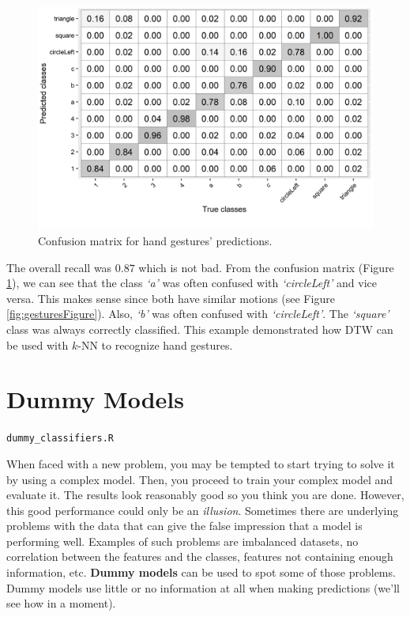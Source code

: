 \documentclass[
  11pt,
]{krantz}
\makeatletter
\newenvironment{kframe}{%
\medskip{}
\setlength{\fboxsep}{.8em}
 \def\at@end@of@kframe{}%
 \ifinner\ifhmode%
  \def\at@end@of@kframe{\end{minipage}}%
  \begin{minipage}{\columnwidth}%
 \fi\fi%
 \def\FrameCommand##1{\hskip\@totalleftmargin \hskip-\fboxsep
 \colorbox{shadecolor}{##1}\hskip-\fboxsep
     \hskip-\linewidth \hskip-\@totalleftmargin \hskip\columnwidth}%
 \MakeFramed {\advance\hsize-\width
   \@totalleftmargin\z@ \linewidth\hsize
   \@setminipage}}%
 {\par\unskip\endMakeFramed%
 \at@end@of@kframe}
\newenvironment{rmdblock}[1]
  {
  \begin{itemize}
  \renewcommand{\labelitemi}{
    \raisebox{-.7\height}[0pt][0pt]{
      {\setkeys{Gin}{width=3em,keepaspectratio}\texttt{[image: images/icons/\#1]}}
    }
  }
  \setlength{\fboxsep}{1em}
  \begin{kframe}
  \item
  }
  {
  \end{kframe}
  \end{itemize}
  }
\newenvironment{rmdfolder}
  {\begin{rmdblock}{folder}}
  {\end{rmdblock}}
\makeatother
\begin{document}
\begin{figure}

{\centering \includegraphics[width=0.9\linewidth]{images/gesturesCM} 

}

\caption{Confusion matrix for hand gestures' predictions.}\label{fig:gesturesCM}
\end{figure}

The overall recall was \(0.87\) which is not bad. From the confusion matrix (Figure \ref{fig:gesturesCM}), we can see that the class \emph{`a'} was often confused with \emph{`circleLeft'} and vice versa. This makes sense since both have similar motions (see Figure \ref{fig:gesturesFigure}). Also, \emph{`b'} was often confused with \emph{`circleLeft'}. The \emph{`square'} class was always correctly classified. This example demonstrated how DTW can be used with \(k\)-NN to recognize hand gestures.

\hypertarget{dummy-models}{%
\section{Dummy Models}\label{dummy-models}}

\begin{rmdfolder}
\texttt{dummy\_classifiers.R}
\end{rmdfolder}

When faced with a new problem, you may be tempted to start trying to solve it by using a complex model. Then, you proceed to train your complex model and evaluate it. The results look reasonably good so you think you are done. However, this good performance could only be an \emph{illusion}. Sometimes there are underlying problems with the data that can give the false impression that a model is performing well. Examples of such problems are imbalanced datasets, no correlation between the features and the classes, features not containing enough information, etc. \textbf{Dummy models} can be used to spot some of those problems. Dummy models use little or no information at all when making predictions (we'll see how in a moment).
\end{document}
